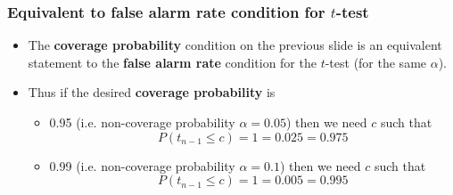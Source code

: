 \documentclass[a4paper]{article}\usepackage[]{graphicx}\usepackage[]{xcolor}
\begin{document}
\subsubsection{Equivalent to false alarm rate condition for \( t \)-test}
\begin{itemize}
	\item The \textcolor{myred}{\textbf{coverage probability}} condition on the previous slide is an equivalent statement to the \textcolor{mygreen}{\textbf{false alarm rate}}  condition for the \( t \)-test (for the same \( \alpha \)).
	\item Thus if the desired \textcolor{myred}{\textbf{coverage probability}} is
	\begin{itemize}
		\item 0.95 (i.e. non-coverage probability \( \alpha = 0.05 \)) then we need \( c \) such that
		\[
			P(t_{n-1} \leq c) = 1 =0.025 = 0.975
		\]
		\item 0.99 (i.e. non-coverage probability \( \alpha = 0.1 \)) then we need \( c \) such that
		\[
			P(t_{n-1} \leq c) = 1 =0.005 = 0.995
		\]
	\end{itemize}
\end{itemize}
\end{document}
